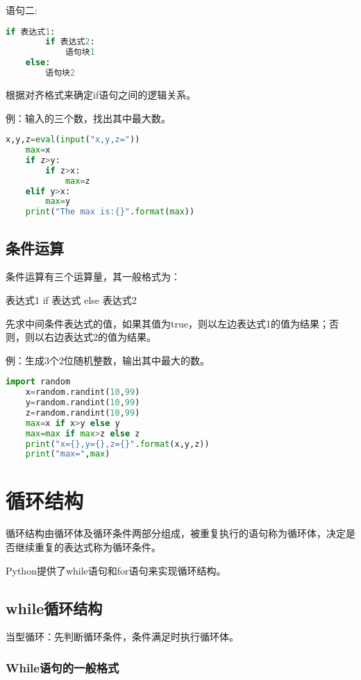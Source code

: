 \documentclass[11pt,a4paper]{article}
\begin{document}
语句二:
\begin{lstlisting}[language={Python}]
    if 表达式1:
        if 表达式2:
            语句块1
    else:
        语句块2
\end{lstlisting}
根据对齐格式来确定if语句之间的逻辑关系。

例：输入的三个数，找出其中最大数。
\begin{lstlisting}[language={Python}]
    x,y,z=eval(input("x,y,z="))
    max=x
    if z>y:
        if z>x:
            max=z
    elif y>x:
        max=y
    print("The max is:{}".format(max))
\end{lstlisting}

\subsection{条件运算}

条件运算有三个运算量，其一般格式为：
\begin{center}
    表达式1 if 表达式 else 表达式2
\end{center}
先求中间条件表达式的值，如果其值为true，则以左边表达式1的值为结果；否则，则以右边表达式2的值为结果。

例：生成3个2位随机整数，输出其中最大的数。
\begin{lstlisting}[language={Python}]
    import random
    x=random.randint(10,99)
    y=random.randint(10,99)
    z=random.randint(10,99)
    max=x if x>y else y
    max=max if max>z else z
    print("x={},y={},z={}".format(x,y,z))
    print("max=",max)
\end{lstlisting}

\newpage

\section{循环结构}

循环结构由循环体及循环条件两部分组成，被重复执行的语句称为循环体，决定是否继续重复的表达式称为循环条件。

Python提供了while语句和for语句来实现循环结构。

\subsection{while循环结构}

当型循环：先判断循环条件，条件满足时执行循环体。

\subsubsection{While语句的一般格式}
\end{document}
